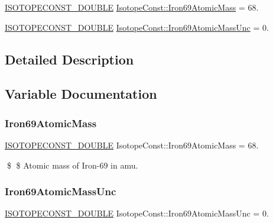 \begin{DoxyCompactItemize}
\item 
\mbox{\hyperlink{group___isotope_const-_macros_ga8f45a7272ce02c0b4c65c44636ed719a}{I\+S\+O\+T\+O\+P\+E\+C\+O\+N\+S\+T\+\_\+\+D\+O\+U\+B\+LE}} \mbox{\hyperlink{group___isotope_const-_iron-_fe69_ga49c04f6f0bdf04301e6921ac961bbfb3}{Isotope\+Const\+::\+Iron69\+Atomic\+Mass}} = 68.
\item 
\mbox{\hyperlink{group___isotope_const-_macros_ga8f45a7272ce02c0b4c65c44636ed719a}{I\+S\+O\+T\+O\+P\+E\+C\+O\+N\+S\+T\+\_\+\+D\+O\+U\+B\+LE}} \mbox{\hyperlink{group___isotope_const-_iron-_fe69_ga7cb55509c625125d44befb47da66851e}{Isotope\+Const\+::\+Iron69\+Atomic\+Mass\+Unc}} = 0.
\end{DoxyCompactItemize}


\subsection{Detailed Description}


\subsection{Variable Documentation}
\mbox{\label{group___isotope_const-_iron-_fe69_ga49c04f6f0bdf04301e6921ac961bbfb3}} 
\subsubsection{\texorpdfstring{Iron69\+Atomic\+Mass}{Iron69AtomicMass}}
{\footnotesize\ttfamily \mbox{\hyperlink{group___isotope_const-_macros_ga8f45a7272ce02c0b4c65c44636ed719a}{I\+S\+O\+T\+O\+P\+E\+C\+O\+N\+S\+T\+\_\+\+D\+O\+U\+B\+LE}} Isotope\+Const\+::\+Iron69\+Atomic\+Mass = 68.}

\$ \$ Atomic mass of Iron-\/69 in amu. \mbox{\label{group___isotope_const-_iron-_fe69_ga7cb55509c625125d44befb47da66851e}} 
\subsubsection{\texorpdfstring{Iron69\+Atomic\+Mass\+Unc}{Iron69AtomicMassUnc}}
{\footnotesize\ttfamily \mbox{\hyperlink{group___isotope_const-_macros_ga8f45a7272ce02c0b4c65c44636ed719a}{I\+S\+O\+T\+O\+P\+E\+C\+O\+N\+S\+T\+\_\+\+D\+O\+U\+B\+LE}} Isotope\+Const\+::\+Iron69\+Atomic\+Mass\+Unc = 0.}

